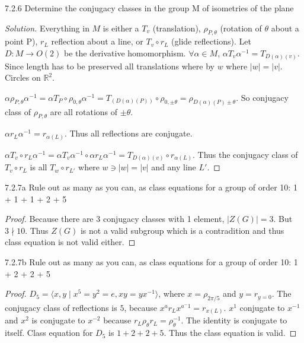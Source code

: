 \documentclass{article}
\newcommand{\R}{\mathbb{R}}
\newenvironment{solution}
{\renewcommand\qedsymbol{$\blacksquare$}\begin{proof}[Solution]}
{\end{proof}}
\begin{document}
\begin{PROB}{7.2.6}\label{Problem 7.2.6.}
    Determine the conjugacy classes in the group M of isometries of the plane
\end{PROB}
\begin{solution}
    Everything in $M$ is either a $T_v$ (translation), $\rho_{P, \theta}$ (rotation of $\theta$ about a point P), $r_L$ reflection about a line, or $T_v \circ r_L$ (glide reflections). Let $D: M \to O(2)$ be the derivative homomorphism. $\forall \alpha \in M$, $\alpha T_v \alpha^{-1} = T_{D(\alpha)(v)}$. Since length has to be preserved all translations where by $w$ where $|w| = |v|$. Circles on $\R^2$. 

    $\alpha \rho_{P, \theta} \alpha^{-1} = \alpha T_P \circ \rho_{0, \theta} \alpha^{-1} = T_(D(\alpha)(P)) \circ \rho_{0, \pm \theta} = \rho_{D(\alpha)(P) \pm \theta}$. So conjugacy class of $\rho_{P, \theta}$ are all rotations of $\pm \theta$.

    $\alpha r_L \alpha^{-1} = r_{\alpha(L)}$. Thus all reflections are conjugate. 

    $\alpha T_v \circ r_L \alpha^{-1} = \alpha T_v \alpha^{-1} \circ \alpha r_L \alpha^{-1} = T_{D(\alpha)(v)} \circ r_{\alpha(L)}$. Thus the conjugacy class of $T_v \circ r_L$ is all $T_w \circ r_{L'}$ where $w \ni |w| = |v|$ and any line $L'$.
\end{solution}

\bigskip

\begin{PROB}{7.2.7a}\label{Problem 7.2.7a.}
    Rule out as many as you can, as class equations for a group of order 10:
    1 + 1 + 1 + 2 + 5
\end{PROB}
\begin{proof}
    Because there are 3 conjugacy classes with 1 element, $|Z(G)| = 3$. But $3 \nmid 10 $. Thus $Z(G)$ is not a valid subgroup which is a contradition and thus class equation is not valid either.
\end{proof}

\begin{PROB}{7.2.7b}\label{Problem 7.2.7b.}
    Rule out as many as you can, as class equations for a group of order 10:
    1 + 2 + 2 + 5
\end{PROB}
\begin{proof}
    $D_5 = \langle x, y \mid x^5 = y^2 = e, xy = yx^{-1} \rangle$, where $x = \rho_{2\pi/5}$ and $y = r_{y = 0}$. The conjugacy class of reflections is $5$, because $x^ar_{L}x^{a^-1} = r_{x(L)}$. $x^{1}$ conjugate to $x^{-1}$ and $x^{2}$ is conjugate to $x^{-2}$ because $r_L\rho_{\theta}r_L = \rho_{\theta}^{-1}$. The identity is conjugate to itself. Class equation for $D_5$ is $1 + 2 + 2 + 5$. Thus the class equation is valid.
\end{proof}
\end{document}
